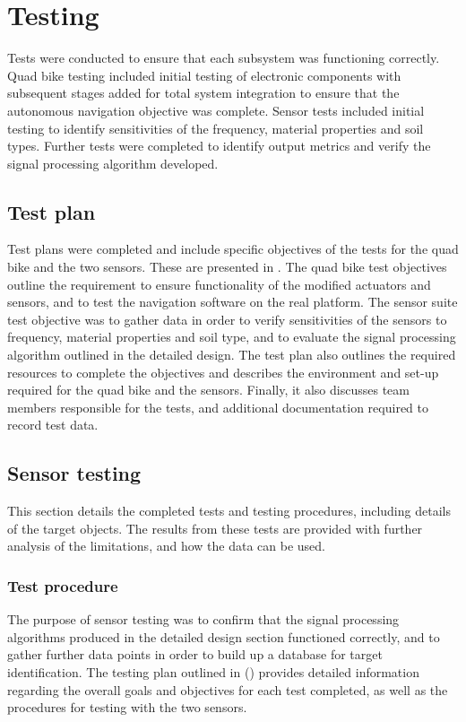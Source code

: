 \documentclass[main.tex]{subfiles}
\begin{document}
\chapter{Testing}
Tests were conducted to ensure that each subsystem was functioning correctly. Quad bike testing included initial testing of electronic components with subsequent stages added for total system integration to ensure that the autonomous navigation objective was complete. Sensor tests included initial testing to identify sensitivities of the frequency, material properties and soil types. Further tests were completed to identify output metrics and verify the signal processing algorithm developed. 

\section{Test plan}
Test plans were completed and include specific objectives of the tests for the quad bike and the two sensors. These are presented in . The quad bike test objectives outline the requirement to ensure functionality of the modified actuators and sensors, and to test the navigation software on the real platform. The sensor suite test objective was to gather data in order to verify sensitivities of the sensors to frequency, material properties and soil type, and to evaluate the signal processing algorithm outlined in the detailed design. The test plan also outlines the required resources to complete the objectives and describes the environment and set-up required for the quad bike and the sensors. Finally, it also discusses team members responsible for the tests, and additional documentation required to record test data. 

\section{Sensor testing}
This section details the completed tests and testing procedures, including details of the target objects. The results from these tests are provided with further analysis of the limitations, and how the data can be used. 

\subsection{Test procedure}
The purpose of sensor testing was to confirm that the signal processing algorithms produced in the detailed design section functioned correctly, and to gather further data points in order to build up a database for target identification. The testing plan outlined in () provides detailed information regarding the overall goals and objectives for each test completed, as well as the procedures for testing with the two sensors. 
\end{document}
